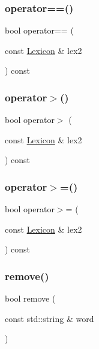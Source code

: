 \mbox{\label{classLexicon_a4fcab616682564bf55eb0b096a35219d}} 
\subsubsection{\texorpdfstring{operator==()}{operator==()}}
{\footnotesize\ttfamily bool operator== (\begin{DoxyParamCaption}\item[{const \mbox{\hyperlink{classLexicon}{Lexicon}} \&}]{lex2 }\end{DoxyParamCaption}) const}

\mbox{\label{classLexicon_a04139ff41f8d25adbf5958ff2b01b068}} 
\subsubsection{\texorpdfstring{operator$>$()}{operator>()}}
{\footnotesize\ttfamily bool operator$>$ (\begin{DoxyParamCaption}\item[{const \mbox{\hyperlink{classLexicon}{Lexicon}} \&}]{lex2 }\end{DoxyParamCaption}) const}

\mbox{\label{classLexicon_a05b7f6593b8b859858cf21ffbc9e5ab1}} 
\subsubsection{\texorpdfstring{operator$>$=()}{operator>=()}}
{\footnotesize\ttfamily bool operator$>$= (\begin{DoxyParamCaption}\item[{const \mbox{\hyperlink{classLexicon}{Lexicon}} \&}]{lex2 }\end{DoxyParamCaption}) const}

\mbox{\label{classLexicon_affc6169b054fb3bbc4d72694e1a5834e}} 
\subsubsection{\texorpdfstring{remove()}{remove()}}
{\footnotesize\ttfamily bool remove (\begin{DoxyParamCaption}\item[{const std\+::string \&}]{word }\end{DoxyParamCaption})}

